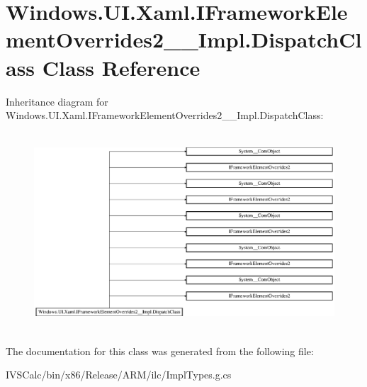 \hypertarget{class_windows_1_1_u_i_1_1_xaml_1_1_i_framework_element_overrides2_____impl_1_1_dispatch_class}{}\section{Windows.\+U\+I.\+Xaml.\+I\+Framework\+Element\+Overrides2\+\_\+\+\_\+\+Impl.\+Dispatch\+Class Class Reference}
\label{class_windows_1_1_u_i_1_1_xaml_1_1_i_framework_element_overrides2_____impl_1_1_dispatch_class}
Inheritance diagram for Windows.\+U\+I.\+Xaml.\+I\+Framework\+Element\+Overrides2\+\_\+\+\_\+\+Impl.\+Dispatch\+Class\+:\begin{figure}[H]
\begin{center}
\leavevmode
\includegraphics[height=7.421687cm]{class_windows_1_1_u_i_1_1_xaml_1_1_i_framework_element_overrides2_____impl_1_1_dispatch_class}
\end{center}
\end{figure}


The documentation for this class was generated from the following file\+:\begin{DoxyCompactItemize}
\item 
I\+V\+S\+Calc/bin/x86/\+Release/\+A\+R\+M/ilc/Impl\+Types.\+g.\+cs\end{DoxyCompactItemize}
